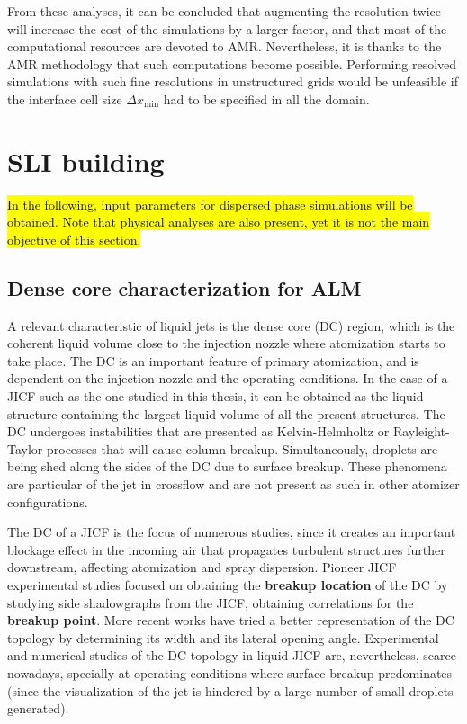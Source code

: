 From these analyses, it can be concluded that  augmenting the resolution twice will increase the cost of the simulations by a larger factor, and that most of the computational resources are devoted to AMR. Nevertheless, it is thanks to the AMR methodology that such computations become possible. Performing resolved simulations with such fine resolutions in unstructured grids would be unfeasible if the interface cell size $\Delta x_\mathrm{min}$ had to be specified in all the domain.



\clearpage


\section{SLI building}

\hl{In the following, input parameters for dispersed phase simulations will be obtained. Note that physical analyses are also present, yet it is not the main objective of this section.}

\subsection{Dense core characterization for ALM}
\label{subsec:ch5_DC_topology_characterization}



A relevant characteristic of liquid jets is the dense core (DC) region, which is the coherent liquid volume close to the injection nozzle where atomization starts to take place. The DC is an important feature of primary atomization, and is dependent on the injection nozzle and the operating conditions. In the case of a JICF such as the one studied in this thesis, it can be obtained as the liquid structure containing the largest liquid volume of all the present structures. The DC undergoes instabilities that are presented as Kelvin-Helmholtz or Rayleight-Taylor processes that will cause column breakup. Simultaneously, droplets are being shed along the sides of the DC due to surface breakup. These phenomena are particular of the jet in crossflow and are not present as such in other atomizer configurations. %

The DC of a JICF is the focus of numerous studies, since it creates an important blockage effect in the incoming air that propagates turbulent structures further downstream, affecting atomization and spray dispersion. Pioneer JICF experimental studies \citepColor[wu_breakup_1997] focused on obtaining the \textbf{breakup location} of the DC by studying side shadowgraphs from the JICF, obtaining correlations for the \textbf{breakup point}. More recent works  have tried a better representation of the DC topology by determining its width and its lateral opening angle. Experimental and numerical studies of the DC topology in liquid JICF are, nevertheless, scarce nowadays, specially at operating conditions where surface breakup predominates (since the visualization of the jet is hindered by a large number of small droplets generated).

